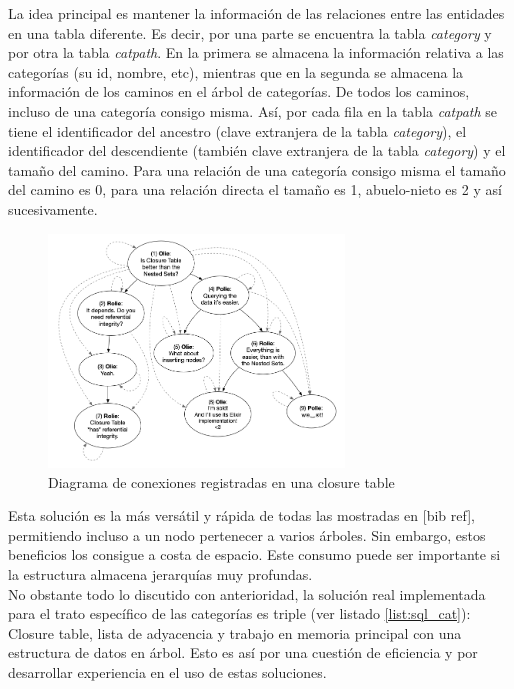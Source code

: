 \documentclass[a4paper]{article}
\begin{document}
    La idea principal es mantener la información de las relaciones entre las entidades en una tabla diferente. Es decir, por una parte se encuentra la tabla \emph{category} y por otra la tabla \emph{catpath}. En la primera se almacena la información relativa a las categorías (su id, nombre, etc), mientras que en la segunda se almacena la información de los caminos en el árbol de categorías. De todos los caminos, incluso de una categoría consigo misma. Así, por cada fila en la tabla \emph{catpath} se tiene el identificador del ancestro (clave extranjera de la tabla \emph{category}), el identificador del descendiente (también clave extranjera de la tabla \emph{category}) y el tamaño del camino. Para una relación de una categoría consigo misma el tamaño del camino es 0, para una relación directa el tamaño es 1, abuelo-nieto es 2 y así sucesivamente.
    
    \begin{figure}[htb!]
    	\centering
    	\includegraphics[width=0.7\textwidth]{closure_table}
    	\caption{Diagrama de conexiones registradas en una closure table}
    	\label{fig:closure_table}
    \end{figure}
    
    Esta solución es la más versátil y rápida de todas las mostradas en [bib ref], permitiendo incluso a un nodo pertenecer a varios árboles. Sin embargo, estos beneficios los consigue a costa de espacio. Este consumo puede ser importante si la estructura almacena jerarquías muy profundas.
    \\
    
    No obstante todo lo discutido con anterioridad, la solución real implementada para el trato específico de las categorías es triple (ver listado \ref{list:sql_cat}): Closure table, lista de adyacencia y trabajo en memoria principal con una estructura de datos en árbol. Esto es así por una cuestión de eficiencia y por desarrollar experiencia en el uso de estas soluciones.
    \\
    
\end{document}
